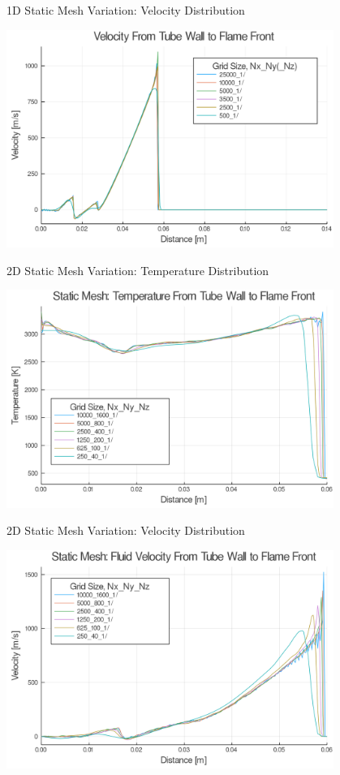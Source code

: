 \begin{frame}{1D Static Mesh Variation: Velocity Distribution}
\begin{center}
\includegraphics[width=0.8\textwidth]{../figs/static1d/u.png}
\end{center}
\end{frame}

\begin{frame}{2D Static Mesh Variation: Temperature Distribution}
\begin{center}
\includegraphics[width=0.8\textwidth]{../figs/staticfigs/t.png}
\end{center}
\end{frame}

\begin{frame}{2D Static Mesh Variation: Velocity Distribution}
\begin{center}
\includegraphics[width=0.8\textwidth]{../figs/staticfigs/u.png}
\end{center}
\end{frame}

